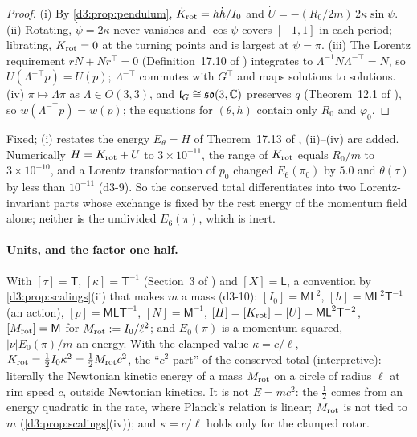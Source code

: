 \begin{proof}
(i) By \cref{d3:prop:pendulum}, $\dot K_{\rm rot}=h\dot h/I_0$ and $\dot U=-(R_0/2m)\,2\kappa\sin\psi$. (ii) Rotating, $\dot\psi=2\kappa$ never vanishes and
$\cos\psi$ covers $[-1,1]$ in each period; librating, $K_{\rm rot}=0$ at the turning points and is largest at $\psi=\pi$. (iii) The Lorentz requirement
$rN+Nr^{\!\top}=0$ (Definition~17.10 of \cite{ES17}) integrates to $\Lambda^{-1}N\Lambda^{-\top}=N$, so $U(\Lambda^{-\top}p)=U(p)$; $\Lambda^{-\top}$ commutes with
$G^{\!\top}$ and maps solutions to solutions. (iv) $\pi\mapsto\Lambda\pi$ as $\Lambda\in O(3,3)$, and $\mathfrak l_G\cong\mathfrak{so}(3,\mathbb{C})$ preserves $q$ (Theorem~12.1 of
\cite{ES17}), so $w(\Lambda^{-\top}p)=w(p)$; the equations for $(\theta,h)$ contain only $R_0$ and $\varphi_0$.
\end{proof}

Fixed; (i) restates the energy $E_\theta=H$ of Theorem~17.13 of \cite{ES17}, (ii)--(iv) are added. Numerically $H=K_{\rm rot}+U$ to $3\times10^{-11}$,
the range of $K_{\rm rot}$ equals $R_0/m$ to $3\times10^{-10}$, and a Lorentz transformation of $p_0$ changed $E_6(\pi_0)$ by $5.0$ and $\theta(\tau)$ by
less than $10^{-11}$ (d3-9). So the conserved total differentiates into two Lorentz-invariant parts whose exchange is fixed by the rest energy of the
momentum field alone; neither is the undivided $E_6(\pi)$, which is inert.

\paragraph{Units, and the factor one half.} With $[\tau]=\mathsf T$, $[\kappa]=\mathsf T^{-1}$ (Section~3 of \cite{ES17}) and $[X]=\mathsf L$, a
convention by \cref{d3:prop:scalings}(ii) that makes $m$ a mass (d3-10): $[I_0]=\mathsf{ML}^2$, $[h]=\mathsf{ML}^2\mathsf T^{-1}$ (an action),
$[p]=\mathsf{MLT}^{-1}$, $[N]=\mathsf M^{-1}$, $[H]=[K_{\rm rot}]=[U]=\mathsf{ML}^2\mathsf T^{-2}$, $[M_{\rm rot}]=\mathsf M$ for $M_{\rm rot}:=I_0/\ell^2$; and
$E_0(\pi)$ is a momentum squared, $|\nu|E_0(\pi)/m$ an energy. With the clamped value $\kappa=c/\ell$,
$K_{\rm rot}=\tfrac12I_0\kappa^2=\tfrac12M_{\rm rot}c^2$, the ``$c^2$ part'' of the conserved total (interpretive): literally the Newtonian kinetic energy
of a mass $M_{\rm rot}$ on a circle of radius $\ell$ at rim speed $c$, outside Newtonian kinetics. It is not $E=mc^2$: the $\tfrac12$ comes from an
energy quadratic in the rate, where Planck's relation is linear; $M_{\rm rot}$ is not tied to $m$ (\cref{d3:prop:scalings}(iv)); and $\kappa=c/\ell$
holds only for the clamped rotor.

